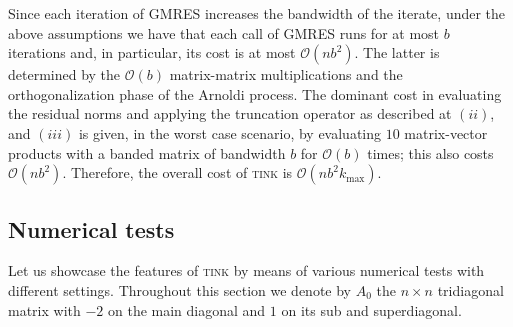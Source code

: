 \documentclass[a4paper,10pt]{article}
\newtheorem{remark}{Remark}
\begin{document}
Since each iteration of GMRES increases the bandwidth of the iterate, under the above assumptions we have that each call of GMRES runs for at most $b$ iterations and, in particular, its cost is at most $\mathcal O(n b^2)$. The latter is determined by the $\mathcal O(b)$ matrix-matrix multiplications and the orthogonalization phase of the Arnoldi process. The dominant cost in evaluating the residual norms and applying the truncation operator as described at $(ii)$, and $(iii)$ is given, in the worst case scenario, by evaluating $10$ matrix-vector products with a banded matrix of bandwidth $b$ for $\mathcal O(b)$ times; this also costs $\mathcal O(nb^2)$. Therefore, the overall cost of \textsc{tink} is $\mathcal O(nb^2k_{\max})$. 








\subsection{Numerical tests}\label{sec:tink-tests}
Let us showcase the features of \textsc{tink} by means of various numerical tests with different settings.
Throughout this section we denote by $A_0$ the $n\times n$ tridiagonal matrix with $-2$ on the main diagonal and $1$ on its sub and superdiagonal.

\end{document}
